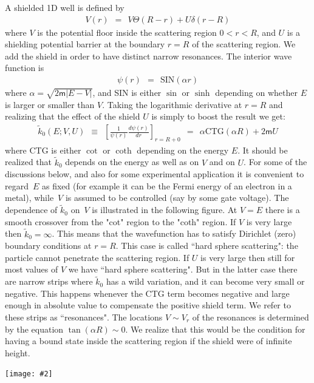\documentclass[onecolumn,fleqn, 11pt]{revtex4}
\newcommand{\mass}{\mathsf{m}}
\newcommand{\putgraph}[2][0.30\hsize]{\texttt{[image: \#2]}}
\newcommand{\beq}{\begin{eqnarray}}
\newcommand{\eeq}{\end{eqnarray}}
\begin{document}
A shielded 1D well is defined by 
\beq
V(r) \ \ = \ \ V \Theta(R-r) + U \delta(r-R) 
\eeq
where $V$ is the potential floor inside 
the scattering region ${0<r<R}$, 
and $U$ is a shielding potential 
barrier at the boundary ${r=R}$ 
of the scattering region. 
We add the shield in order to have 
distinct narrow resonances.   
The interior wave function is 
\beq
\psi(r) \ \ = \ \ \mbox{SIN}(\alpha r)
\eeq
where ${\alpha = \sqrt{2\mass |E-V|}}$, 
and SIN is either $\sin$ or $\sinh$ 
depending on whether $E$ is larger or 
smaller than $V$. 
Taking the logarithmic derivative at ${r=R}$ 
and realizing that the effect of the 
shield $U$ is simply to boost the result we get: 
\beq
\tilde{k}_0(E; V,U) 
\ \ \equiv \ \ \left[\frac{1}{\psi(r)}\frac{d\psi(r)}{dr}\right]_{r=R+0}
\ \ = \ \ \alpha \mbox{CTG}(\alpha R) + 2\mass U
\eeq
where CTG is either $\cot$ or $\coth$ 
depending on the energy $E$. 
It should be realized that $\tilde{k}_0$ 
depends on the energy as well as on $V$ 
and on $U$. For some of the discussions 
below, and also for some experimental application 
it is convenient to regard~$E$ 
as fixed (for example it can be the Fermi energy 
of an electron in a metal), 
while~$V$ is assumed to be controlled 
(say by some gate voltage). 
The dependence of $\tilde{k}_0$     
on~$V$ is illustrated in the following figure.  
At $V=E$ there is a smooth crossover 
from the "cot" region to the "coth" region.
If $V$ is very large then $\tilde{k}_0=\infty$. 
This means that the wavefunction has to 
satisfy Dirichlet (zero) boundary conditions at ${r=R}$. 
This case is called ``hard sphere scattering": 
the particle cannot penetrate the scattering 
region. If $U$ is very large then still for most 
values of $V$ we have ``hard sphere scattering".
But in the latter case there are narrow strips 
where $\tilde{k}_0$ has a wild variation, 
and it can become very small or negative.
This happens whenever the CTG term 
becomes negative and large enough in absolute
value to compensate the positive shield term.   
We refer to these strips as ``resonances". 
The locations ${V \sim V_r}$ of the resonances 
is determined by the 
equation $\tan(\alpha R) \sim 0$. 
We realize that this would be the condition 
for having a bound state inside the scattering 
region if the shield were of infinite height. 


\begin{center}
\putgraph[0.4\hsize]{AttractiveWellklV}
\end{center}
\end{document}
